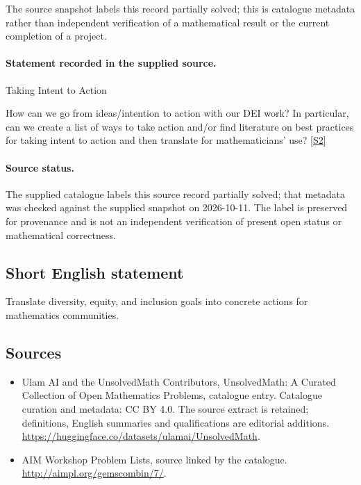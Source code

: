 \documentclass[11pt]{article}
\begin{document}
The source snapshot labels this record partially solved; this is catalogue metadata rather than independent verification of a mathematical result or the current completion of a project.
\paragraph{Statement recorded in the supplied source.}
Taking Intent to Action

How can we go from ideas/intention to action with our DEI work? In particular, can we create a list of ways to take action and/or find literature on best practices for taking intent to action and then translate for mathematicians' use? \href{http://aimpl.org/gemscombin/7/}{[S2]}
\paragraph{Source status.}
The supplied catalogue labels this source record partially solved; that metadata was checked against the supplied snapshot on 2026-10-11. The label is preserved for provenance and is not an independent verification of present open status or mathematical correctness.
\subsection{Short English statement}
Translate diversity, equity, and inclusion goals into concrete actions for mathematics communities.
\subsection{Sources}
\begin{itemize}
\item[S1] Ulam AI and the UnsolvedMath Contributors, UnsolvedMath: A Curated Collection of Open Mathematics Problems, catalogue entry. Catalogue curation and metadata: CC BY 4.0. The source extract is retained; definitions, English summaries and qualifications are editorial additions.
\url{https://huggingface.co/datasets/ulamai/UnsolvedMath}.
\item[S2] AIM Workshop Problem Lists, source linked by the catalogue.
\url{http://aimpl.org/gemscombin/7/}.
\end{itemize}
\end{document}

